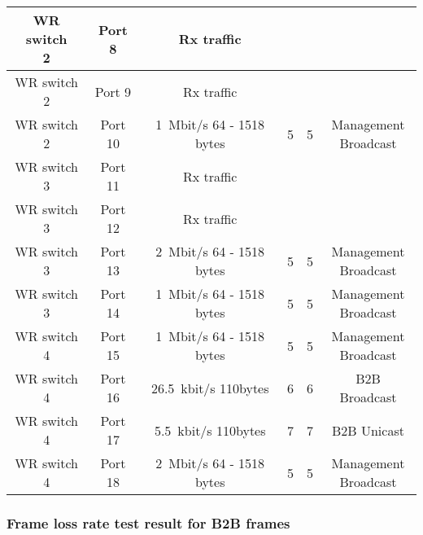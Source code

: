 \begin{table}[!htb]
\begin{center}
\begin{tabular}{ | c | c | c | c | c | c | }
	\tabincell{c}{WR switch \\ 2} & Port 8 & Rx traffic &  &  & \\ \hline
	\tabincell{c}{WR switch \\ 2} & Port 9 & Rx traffic &  &  & \\ \hline
   \tabincell{c}{WR switch \\ 2} & Port 10 & \SI{1}{Mbit/s} 64 - 1518 bytes& 5 & 5 &  \tabincell{c}{Management \\ Broadcast} \\ \hline
	\tabincell{c}{WR switch \\ 3} & Port 11 & Rx traffic &  &  & \\ \hline
	\tabincell{c}{WR switch \\ 3} & Port 12 & Rx traffic &  &  & \\ \hline
   \tabincell{c}{WR switch \\ 3} & Port 13 & \SI{2}{Mbit/s} 64 - 1518 bytes& 5 & 5 &  \tabincell{c}{Management \\ Broadcast} \\ \hline
	\tabincell{c}{WR switch \\ 3} & Port 14 & \SI{1}{Mbit/s} 64 - 1518 bytes& 5 & 5 &  \tabincell{c}{Management \\ Broadcast} \\ \hline
	\tabincell{c}{WR switch \\ 4} & Port 15 & \SI{1}{Mbit/s} 64 - 1518 bytes& 5 & 5 &  \tabincell{c}{Management \\ Broadcast} \\ \hline
   \tabincell{c}{WR switch \\ 4} & Port 16 & \SI{26.5}{kbit/s} 110bytes & 6 & 6 & B2B Broadcast \\ \hline
	\tabincell{c}{WR switch \\ 4} & Port 17 & \SI{5.5}{kbit/s} 110bytes & 7 & 7 & B2B Unicast \\ \hline
	\tabincell{c}{WR switch \\ 4} & Port 18 & \SI{2}{Mbit/s} 64 - 1518 bytes& 5 & 5 &  \tabincell{c}{Management \\ Broadcast} \\ \hline
    
    \end{tabular}
\end{center}
\end{table}

\subsubsection{Frame loss rate test result for B2B frames}

